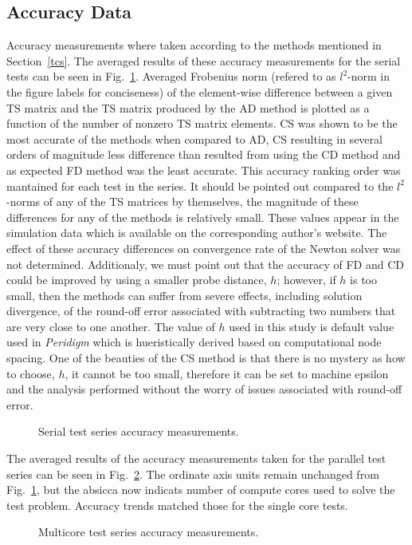\documentclass[preprint,12pt]{elsarticle}
\begin{document}
\subsection{Accuracy Data}
Accuracy measurements where taken according to the methods mentioned in Section~\ref{tcs}. The averaged results of these accuracy measurements for the serial tests can be seen in Fig.~\ref{fig:serial_accuracy}. Averaged Frobenius norm (refered to as $l^2$-norm in the figure labels for conciseness) of the element-wise difference between a given TS matrix and the TS matrix produced by the AD method is plotted as a function of the number of nonzero TS matrix elements. CS was shown to be the most accurate of the methods when compared to AD, CS resulting in several orders of magnitude less difference than resulted from using the CD method and as expected FD method was the least accurate. This accuracy ranking order was mantained for each test in the series. It should be pointed out compared to the $l^2$-norms of any of the TS matrices by themselves, the magnitude of these differences for any of the methods is relatively small. These values appear in the simulation data which is available on the corresponding author's website. The effect of these accuracy differences on convergence rate of the Newton solver was not determined.  Additionaly, we must point out that the accuracy of FD and CD could be improved by using a smaller probe distance, $h$; however, if $h$ is too small, then the methods can suffer from severe effects, including solution divergence, of the round-off error associated with subtracting two numbers that are very close to one another.  The value of $h$ used in this study is default value used in \emph{Peridigm} which is hueristically derived based on computational node spacing.  One of the beauties of the CS method is that there is no mystery as how to choose, $h$, it cannot be too small, therefore it can be set to machine epsilon and the analysis performed without the worry of issues associated with round-off error.
%
\begin{figure}[tbp]
  \centering
  \scalebox{1.0}{}
  \caption{Serial test series accuracy measurements.}
  \label{fig:serial_accuracy}
\end{figure}
%
The averaged results of the accuracy measurements taken for the parallel test series can be seen in Fig.~\ref{fig:multi_accuracy}. The ordinate axis units remain unchanged from Fig.~\ref{fig:serial_accuracy}, but the absicca now indicats number of compute cores used to solve the test problem. Accuracy trends matched those for the single core tests. 
%
\begin{figure}[tbp]
  \centering
  \scalebox{1.0}{}
  \caption{Multicore test series accuracy measurements.}
  \label{fig:multi_accuracy}
\end{figure}
\end{document}
